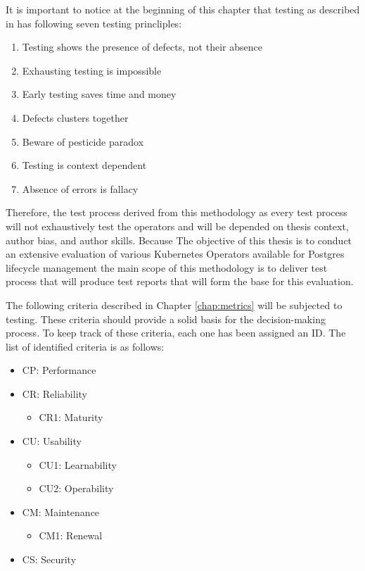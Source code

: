 It is important to notice at the beginning of this chapter that testing as described in \cite{FoundationOfSoftwareTesting} has following seven testing princliples:
\begin{enumerate}
    \item Testing shows the presence of defects, not their absence
    \item Exhausting testing is impossible
    \item Early testing saves time and money
    \item Defects clusters together
    \item Beware of pesticide paradox
    \item Testing is context dependent
    \item Absence of errors is fallacy
\end{enumerate}



Therefore, the test process derived from this methodology as every test process will not exhaustively test the operators and will be depended on thesis context, author bias, and author skills. Because The objective of this thesis is to conduct an extensive evaluation of various Kubernetes
Operators available for Postgres lifecycle management the main scope of this methodology is to deliver test process that will produce test reports that will form the base for this evaluation.

The following criteria described in Chapter \ref{chap:metrics} will be subjected to testing. These criteria should provide a solid basis for the decision-making process. To keep track of these criteria, each one has been assigned an ID. The list of identified criteria is as follows:

\begin{itemize}
    \item	CP: Performance
    \item	CR: Reliability
          \begin{itemize}
              \item	CR1: Maturity
          \end{itemize}
    \item	CU: Usability
          \begin{itemize}
              \item	CU1: Learnability
              \item  CU2: Operability
          \end{itemize}
    \item	CM: Maintenance
          \begin{itemize}
              \item	CM1: Renewal
          \end{itemize}
    \item	CS: Security
\end{itemize}


